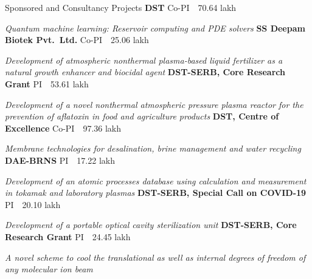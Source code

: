 \begin{rubric}{Sponsored and Consultancy Projects}
\entry*[2026 -- 2029]%
  \textbf{DST} \hfill Co-PI \textperiodcentered\ \scalebox{0.8}{\faRupeeSign}\,70.64 lakh \textperiodcentered\ \par
  \emph{Quantum machine learning: Reservoir computing and PDE solvers}
\entry*[2025 -- 2026]%
  \textbf{SS Deepam Biotek Pvt.\ Ltd.} \hfill Co-PI \textperiodcentered\ \scalebox{0.8}{\faRupeeSign}\,25.06 lakh \textperiodcentered\ \par
  \emph{Development of atmospheric nonthermal plasma-based liquid fertilizer as a natural growth enhancer and biocidal agent}
\entry*[2024 -- 2027]%
  \textbf{DST-SERB, Core Research Grant} \hfill PI \textperiodcentered\ \scalebox{0.8}{\faRupeeSign}\,53.61 lakh \textperiodcentered\ \par
  \emph{Development of a novel nonthermal atmospheric pressure plasma reactor for the prevention of aflatoxin in food and agriculture products}
\entry*[2023 -- 2028]%
  \textbf{DST, Centre of Excellence} \hfill Co-PI \textperiodcentered\ \scalebox{0.8}{\faRupeeSign}\,97.36 lakh \textperiodcentered\ \par
  \emph{Membrane technologies for desalination, brine management and water recycling}
\entry*[2023 -- 2026]%
  \textbf{DAE-BRNS} \hfill PI \textperiodcentered\ \scalebox{0.8}{\faRupeeSign}\,17.22 lakh \textperiodcentered\ \par
  \emph{Development of an atomic processes database using calculation and measurement in tokamak and laboratory plasmas}
\entry*[2020 -- 2021]%
  \textbf{DST-SERB, Special Call on COVID-19} \hfill PI \textperiodcentered\ \scalebox{0.8}{\faRupeeSign}\,20.10 lakh \textperiodcentered\ \par
  \emph{Development of a portable optical cavity sterilization unit}
\entry*[2019 -- 2022]%
  \textbf{DST-SERB, Core Research Grant} \hfill PI \textperiodcentered\ \scalebox{0.8}{\faRupeeSign}\,24.45 lakh \textperiodcentered\ \par
  \emph{A novel scheme to cool the translational as well as internal degrees of freedom of any molecular ion beam}


\end{rubric}
